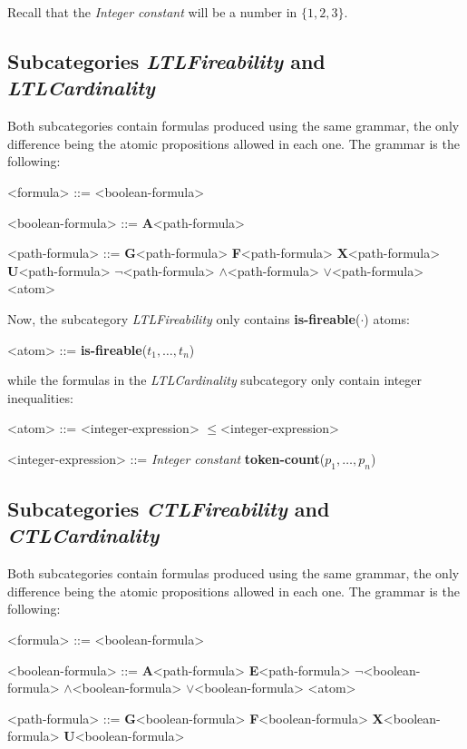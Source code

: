 \documentclass[10pt,english,a4paper]{article}
\newcommand\set[1]           {{\{ #1 \mathclose \}}}
\newcommand\ctla             {\textbf{A}\xspace}
\newcommand\ctle             {\textbf{E}\xspace}
\newcommand\ltlf             {\textbf{F}\xspace}
\newcommand\ltlg             {\textbf{G}\xspace}
\newcommand\ltlx             {\textbf{X}\xspace}
\newcommand\ltlu             {\textbf{U}\xspace}
\newcommand\logicnot         {\boldmath$\lnot$\xspace}
\newcommand\logicand         {\boldmath$\land$\xspace}
\newcommand\logicor          {\boldmath$\lor$\xspace}
\newcommand\atomleq          {\boldmath$\leq$\xspace}
\newcommand\atomisfire[1]    {\textbf{is-fireable}(#1)}
\newcommand\atomtokenscnt[1] {\textbf{token-count}(#1)}
\newcommand\mysubsection[1]{\color{sectioncolor}\subsection{#1}\color{defaultcolor}}
\begin{document}
Recall that the \textit{Integer constant} will be a number in $\set{1,2,3}$.


\mysubsection{Subcategories \textit{LTLFireability} and \textit{LTLCardinality}}

Both subcategories contain formulas produced using the same grammar, the
only difference being the atomic propositions allowed in each one.
The grammar is the following:

\begin{grammar}

<formula> ::= <boolean-formula>

<boolean-formula> ::= \ctla <path-formula>

<path-formula> ::=
     \ltlg <path-formula>
\alt \ltlf <path-formula>
\alt \ltlx <path-formula>
 \ltlu <path-formula>
\alt \logicnot <path-formula>
 \logicand <path-formula>
 \logicor <path-formula>
\alt <atom>

\end{grammar}

Now, the subcategory \emph{LTLFireability} only contains
\atomisfire{$\cdot$} atoms:

\begin{grammar}
<atom> ::= \atomisfire{$t_1, \ldots, t_n$}
\end{grammar}

while the formulas in the \emph{LTLCardinality} subcategory only contain
integer inequalities:

\begin{grammar}
<atom> ::= <integer-expression> \atomleq <integer-expression>

<integer-expression> ::= \textit{Integer constant}
\alt \atomtokenscnt{$p_1, \ldots, p_n$}
\end{grammar}


\mysubsection{Subcategories \emph{CTLFireability} and \emph{CTLCardinality}}

Both subcategories contain formulas produced using the same grammar, the
only difference being the atomic propositions allowed in each one.
The grammar is the following:

\begin{grammar}
<formula> ::= <boolean-formula>

<boolean-formula> ::=
     \ctla <path-formula>
\alt \ctle <path-formula>
\alt \logicnot <boolean-formula>
 \logicand <boolean-formula>
 \logicor <boolean-formula>
\alt <atom>

<path-formula> ::=
     \ltlg <boolean-formula>
\alt \ltlf <boolean-formula>
\alt \ltlx <boolean-formula>
 \ltlu <boolean-formula>
\end{grammar}
\end{document}
